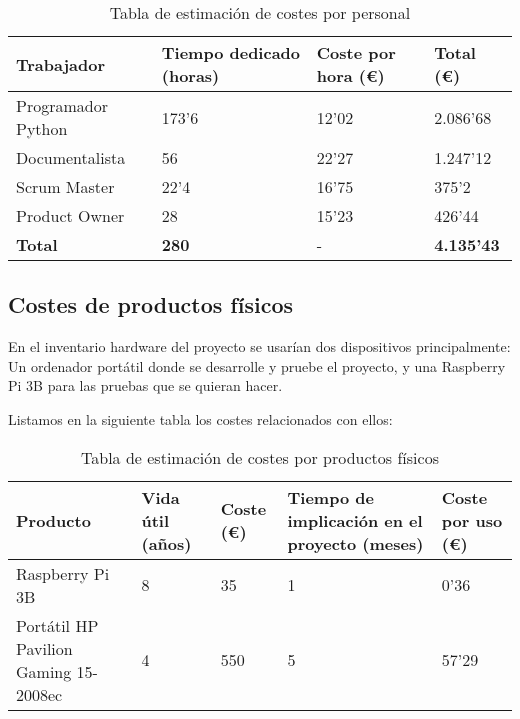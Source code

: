 \begin{center}
	\begin{table}[H]
		\centering
		\begin{tabularx}{\textwidth}{|X|X|X|X|}
			\hline
			\cellcolor{lightblue}\textbf{Trabajador} & \cellcolor{lightblue}\textbf{Tiempo dedicado (horas)} & \cellcolor{lightblue}\textbf{Coste por hora (€)} & \cellcolor{lightblue}\textbf{Total (€)} \\
			\hline
			Programador Python & 173'6 & 12'02 & 2.086'68  \\
			\hline
			Documentalista & 56 & 22'27 & 1.247'12 \\
			\hline
			Scrum Master & 22'4 & 16'75 & 375'2 \\
			\hline
			Product Owner & 28 & 15'23 & 426'44 \\
			\hline
			\textbf{Total} & \textbf{280} & - & \textbf{4.135'43} \\
			\hline
		\end{tabularx}
		\caption{Tabla de estimación de costes por personal}
	\end{table}
\end{center}
	
\subsection {Costes de productos físicos}
En el inventario hardware del proyecto se usarían dos dispositivos principalmente: Un ordenador portátil donde se desarrolle y pruebe el proyecto, y una Raspberry Pi 3B para las pruebas que se quieran hacer.

Listamos en la siguiente tabla los costes relacionados con ellos:

\begin{center}
	\begin{table}[H]
		\centering
		\begin{tabularx}{\textwidth}{|X|X|X|X|X|}
			\hline
			\cellcolor{lightblue}\textbf{Producto} & 
			\cellcolor{lightblue}\textbf{Vida útil (años)} &  \cellcolor{lightblue}\textbf{Coste (€)} &
			\cellcolor{lightblue}\textbf{Tiempo de implicación en el proyecto (meses)} &
			\cellcolor{lightblue}\textbf{Coste por uso (€)} \\
			\hline
			Raspberry Pi 3B & 8 & 35 & 1 & 0'36\\
			\hline
			Portátil HP Pavilion Gaming 15-2008ec & 4 & 550 & 5 & 57'29\\
			\hline
		\end{tabularx}
		\caption{Tabla de estimación de costes por productos físicos}
	\end{table}
\end{center}


